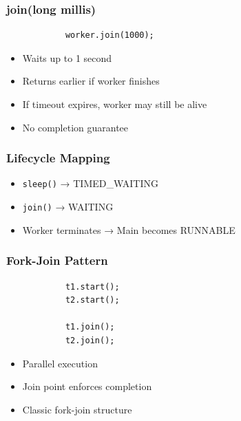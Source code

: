 \documentclass[aspectratio=169,11pt]{beamer}
\begin{document}
	\begin{frame}[fragile]
		\frametitle{join(long millis)}
		
		\begin{lstlisting}
			worker.join(1000);
		\end{lstlisting}
		
		\begin{itemize}
			\item Waits up to 1 second
			\item Returns earlier if worker finishes
			\item If timeout expires, worker may still be alive
			\item No completion guarantee
		\end{itemize}
		
	\end{frame}
	
	\begin{frame}
		\frametitle{Lifecycle Mapping}
		
		\begin{itemize}
			\item \texttt{sleep()} → TIMED\_WAITING
			\item \texttt{join()} → WAITING
			\item Worker terminates → Main becomes RUNNABLE
		\end{itemize}
		
	\end{frame}
	
	\begin{frame}[fragile]
		\frametitle{Fork-Join Pattern}
		
		\begin{lstlisting}
			t1.start();
			t2.start();
			
			t1.join();
			t2.join();
		\end{lstlisting}
		
		\begin{itemize}
			\item Parallel execution
			\item Join point enforces completion
			\item Classic fork-join structure
		\end{itemize}
		
	\end{frame}
	
\end{document}
